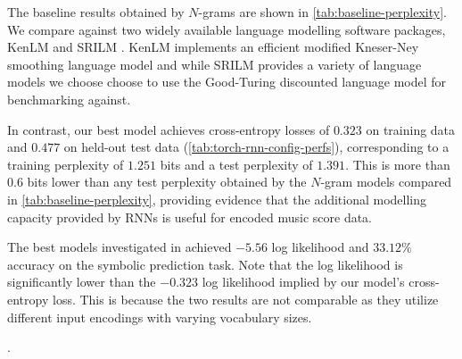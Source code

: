 The baseline results obtained by $N$-grams are shown in
\vref{tab:baseline-perplexity}. We compare against two widely available
language modelling software packages, KenLM \citep{Heafield-estimate} and
SRILM \citep{stolcke2002srilm}. KenLM implements an efficient modified
Kneser-Ney smoothing language model and while SRILM provides a variety of
language models we choose choose to use the Good-Turing discounted language
model for benchmarking against.

In contrast, our best model achieves cross-entropy losses of $0.323$ on
training data and $0.477$ on held-out test data
(\vref{tab:torch-rnn-config-perfs}), corresponding to a training perplexity of
$1.251$ bits and a test perplexity of $1.391$. This is more
than $0.6$ bits lower than any test perplexity obtained by the $N$-gram
models compared in \vref{tab:baseline-perplexity}, providing evidence
that the additional modelling capacity provided by RNNs is useful
for encoded music score data.

The best models investigated in \citet{Boulanger-Lewandowski2012} achieved
$-5.56$ log likelihood and $33.12\%$ accuracy on the symbolic prediction task.
Note that the log likelihood is significantly lower than the $-0.323$ log
likelihood implied by our model's cross-entropy loss. This is because the two
results are not comparable as they utilize different input encodings with
varying vocabulary sizes.

.

